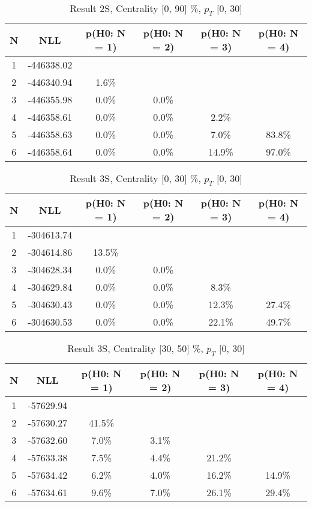 \begin{table}[htb]
	\begin{center}
	\caption{Result 2S, Centrality [0, 90] \%, $p_{T}$ [0, 30] \GeV
}
{\footnotesize\renewcommand{\arraystretch}{1.4}
		\begin{tabular}{cc||cccc}
			N & NLL & p(H0: N = 1) & p(H0: N = 2) & p(H0: N = 3) & p(H0: N = 4)\\ 
		\hline
1 & -446338.02 & & & & \\
2 & -446340.94 & 1.6\% & & & \\
3 & -446355.98 & 0.0\% & 0.0\% & & \\
4 & -446358.61 & 0.0\% & 0.0\% & 2.2\% & \\
5 & -446358.63 & 0.0\% & 0.0\% & 7.0\% & 83.8\% \\
6 & -446358.64 & 0.0\% & 0.0\% & 14.9\% & 97.0\% \\
	\end{tabular}
		\label{tab:lab}
	}
	\end{center}\end{table}

\begin{table}[htb]
	\begin{center}
	\caption{Result 3S, Centrality [0, 30] \%, $p_{T}$ [0, 30] \GeV
}
{\footnotesize\renewcommand{\arraystretch}{1.4}
		\begin{tabular}{cc||cccc}
			N & NLL & p(H0: N = 1) & p(H0: N = 2) & p(H0: N = 3) & p(H0: N = 4)\\ 
		\hline
1 & -304613.74 & & & & \\
2 & -304614.86 & 13.5\% & & & \\
3 & -304628.34 & 0.0\% & 0.0\% & & \\
4 & -304629.84 & 0.0\% & 0.0\% & 8.3\% & \\
5 & -304630.43 & 0.0\% & 0.0\% & 12.3\% & 27.4\% \\
6 & -304630.53 & 0.0\% & 0.0\% & 22.1\% & 49.7\% \\
	\end{tabular}
		\label{tab:lab}
	}
	\end{center}\end{table}

\begin{table}[htb]
	\begin{center}
	\caption{Result 3S, Centrality [30, 50] \%, $p_{T}$ [0, 30] \GeV
}
{\footnotesize\renewcommand{\arraystretch}{1.4}
		\begin{tabular}{cc||cccc}
			N & NLL & p(H0: N = 1) & p(H0: N = 2) & p(H0: N = 3) & p(H0: N = 4)\\ 
		\hline
1 & -57629.94 & & & & \\
2 & -57630.27 & 41.5\% & & & \\
3 & -57632.60 & 7.0\% & 3.1\% & & \\
4 & -57633.38 & 7.5\% & 4.4\% & 21.2\% & \\
5 & -57634.42 & 6.2\% & 4.0\% & 16.2\% & 14.9\% \\
6 & -57634.61 & 9.6\% & 7.0\% & 26.1\% & 29.4\% \\
	\end{tabular}
		\label{tab:lab}
	}
	\end{center}\end{table}

